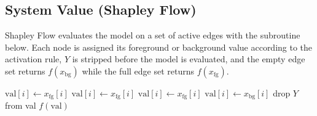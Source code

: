 \documentclass[12pt,a4paper,oneside]{article}
\begin{document}
\subsection{System Value (Shapley Flow)}

Shapley Flow evaluates the model on a set of active edges with the subroutine below. Each node is assigned its foreground or background value according to the activation rule, $Y$ is stripped before the model is evaluated, and the empty edge set returns $f(x_{\mathrm{bg}})$ while the full edge set returns $f(x_{\mathrm{fg}})$.

\begin{algorithm}[H]
  \caption{SYSTEM\_VALUE --- binary foreground/background activation}
  \label{alg:system_value}
  \begin{algorithmic}[1]
          $\mathrm{val}[i] \gets x_{\mathrm{fg}}[i]$
          $\mathrm{val}[i] \gets x_{\mathrm{fg}}[i]$
          $\mathrm{val}[i] \gets x_{\mathrm{fg}}[i]$
        \Else
          $\mathrm{val}[i] \gets x_{\mathrm{bg}}[i]$
        \EndIf
      \EndFor
      \State drop $Y$ from val  
      \Return $f(\mathrm{val})$
    \EndFunction
  \end{algorithmic}
\end{algorithm}
\end{document}
